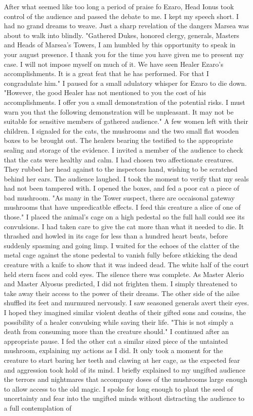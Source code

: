 \documentclass{article}
\begin{document}
After what seemed like too long a period of praise fo Ezaro, Head Ionus took control of the audience and passed the debate to me. I kept my speech short. I had no grand dreams to weave. Just a sharp revelation of the dangers Marsea was about to walk into blindly. "Gathered Dukes, honored clergy, generals, Masters and Heads of Marsea's Towers, I am humbled by this opportunity to speak in your august presence. I thank you for the time you have given me to present my case. I will not impose myself on much of it. We have seen Healer Ezaro's accomplishments. It is a great feat that he has performed. For that I congradulate him." I paused for a small adulatory whisper for Ezaro to die down. "However, the good Healer has not mentioned to you the cost of his accomplishments. I offer you a small demonstration of the potential risks. I must warn you that the following demonstration will be unpleasant. It may not be suitable for sensitive members of gathered audience." A few women left with their children. I signaled for the cats, the mushrooms and the two small flat wooden boxes to be brought out. The healers bearing the testified to the appropriate sealing and storage of the evidence. I invited a member of the audience to check that the cats were healthy and calm. I had chosen two affectionate creatures. They rubbed her head against to the inspectors hand, wishing to be scratched behind her ears. The audience laughed. I took the moment to verify that my seals had not been tampered with. I opened the boxes, and fed a poor cat a piece of bad mushroom. "As many in the Tower suspect, there are occaisonal gateway mushrooms that have unpredicatble effects. I feed this creature a slice of one of those." I placed the animal's cage on a high pedestal so the full hall could see its convulsions. I had taken care to give the cat more than what it needed to die. It thrashed and howled in its cage for less than a hundred heart beats, before suddenly spasming and going limp. I waited for the echoes of the clatter of the metal cage against the stone pedestal to vanish fully before stkicking the dead creature with a knife to show that it was indeed dead. The white half of the court held stern faces and cold eyes. The silence there was complete. As Master Alerio and Master Alyosus predicted, I did not frighten them. I simply threatened to take away their access to the power of their dreams. The other side of the ailse shuffled its feet and murmured nervously. I saw seasoned generals avert their eyes. I hoped they imagined similar violent deaths of their gifted sons and cousins, the possibility of a healer convulsing while saving their life. "This is not simply a death from consuming more than the creature should." I continued after an appropriate pause. I fed the other cat a similar sized piece of the untainted mushroom, explaining my actions as I did. It only took a moment for the creature to start baring her teeth and clawing at her cage, as the expected fear and aggression took hold of its mind. I briefly explained to my ungifted audience the terrors and nightmares that accompany doses of the mushrooms large enough to allow access to the old magic. I spoke for long enough to plant the seed of uncertainty and fear into the ungifted minds without distracting the audience to a full contemplation of 
\end{document}
